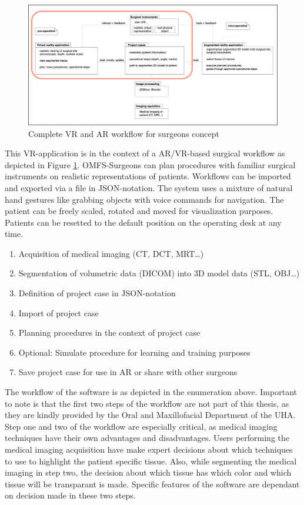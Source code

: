 \begin{figure}[ht!]
    \centering
    \includegraphics[width=\linewidth]{images/project_plan.png}
    \caption{\label{fig::ProjectPlan} Complete VR and AR workflow for surgeons concept}
\end{figure}

This VR-application is in the context of a AR/VR-based surgical workflow as depicted in Figure \ref{fig::ProjectPlan}.
OMFS-Surgeons can plan procedures with familiar surgical instruments on realistic representations of patients.
Workflows can be imported and exported via a file in JSON-notation.
The system uses a mixture of natural hand gestures like grabbing objects with voice commands for navigation.
The patient can be freely scaled, rotated and moved for visualization purposes.
Patients can be resetted to the default position on the operating desk at any time.

\begin{enumerate}
    \item Acquisition of medical imaging (CT, DCT, MRT\ldots)
    \item Segmentation of volumetric data (DICOM) into 3D model data (STL, OBJ\ldots)
    \item Definition of project case in JSON-notation
    \item Import of project case
    \item Planning procedures in the context of project case
    \item Optional: Simulate procedure for learning and training purposes
    \item Save project case for use in AR or share with other surgeons
\end{enumerate}

The workflow of the software is as depicted in the enumeration above.
Important to note is that the first two steps of the workflow are not part of this thesis, as they are kindly provided by the Oral and Maxillofacial Department of the UHA.
Step one and two of the workflow are especially critical, as medical imaging techniques have their own advantages and disadvantages.
Users performing the medical imaging acquisition have make expert decisions about which techniques to use to highlight the patient specific tissue.
Also, while segmenting the medical imaging in step two, the decision about which tissue has which color and which tissue will be transparant is made.
Specific features of the software are dependant on decision made in these two steps.

